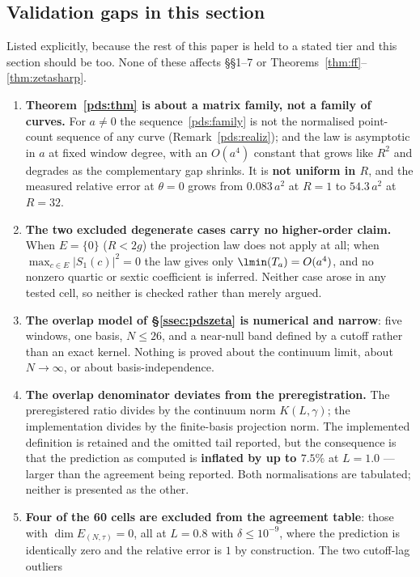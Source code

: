 \subsection{Validation gaps in this section}\label{ssec:pdsgaps}

Listed explicitly, because the rest of this paper is held to a stated tier and this section
should be too. None of these affects \S\S1--7 or Theorems~\ref{thm:ff}--\ref{thm:zetasharp}.

\begin{enumerate}\itemsep3pt
\item \textbf{Theorem~\ref{pds:thm} is about a matrix family, not a family of curves.} For
$a\ne0$ the sequence~\eqref{pds:family} is not the normalised point-count sequence of any
curve (Remark~\ref{pds:realiz}); and the law is asymptotic in $a$ at fixed window degree,
with an $O(a^{4})$ constant that grows like $R^{2}$ and degrades as the complementary gap
shrinks. It is \textbf{not uniform in $R$}, and the measured relative error at $\theta=0$
grows from $0.083\,a^{2}$ at $R=1$ to $54.3\,a^{2}$ at $R=32$.
\item \textbf{The two excluded degenerate cases carry no higher-order claim.} When
$E=\{0\}$ ($R<2g$) the projection law does not apply at all; when
$\max_{c\in E}|S_1(c)|^{2}=0$ the law gives only $\lmin(T_a)=O(a^{4})$, and no nonzero
quartic or sextic coefficient is inferred. Neither case arose in any tested cell, so
neither is checked rather than merely argued.
\item \textbf{The overlap model of \S\ref{ssec:pdszeta} is numerical and narrow}: five
windows, one basis, $N\le26$, and a near-null band defined by a cutoff rather than an exact
kernel. Nothing is proved about the continuum limit, about $N\to\infty$, or about
basis-independence.
\item \textbf{The overlap denominator deviates from the preregistration.} The preregistered
ratio divides by the continuum norm $K(L,\gamma)$; the implementation divides by the
finite-basis projection norm. The implemented definition is retained and the omitted tail
reported, but the consequence is that the prediction as computed is \textbf{inflated by up
to $7.5\%$} at $L=1.0$ --- larger than the agreement being reported. Both normalisations are
tabulated; neither is presented as the other.
\item \textbf{Four of the 60 cells are excluded from the agreement table}: those with
$\dim E_{(N,\tau)}=0$, all at $L=0.8$ with $\delta\le10^{-9}$, where the prediction is
identically zero and the relative error is $1$ by construction. The two cutoff-lag outliers

\end{enumerate}
